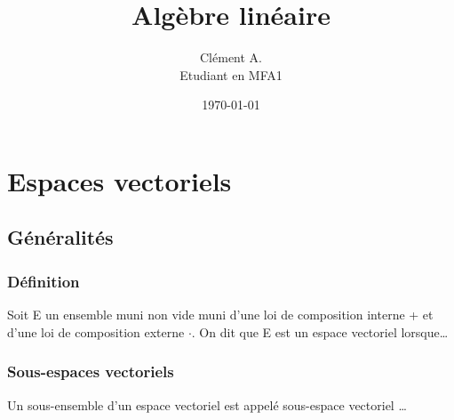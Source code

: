 \documentclass[a4paper,12pt]{report}
\title{Algèbre linéaire}%
\author{Clément A.\\ Etudiant en MFA1}%
\date{\today}%
\begin{document}
\maketitle%

\chapter{Espaces vectoriels}
\section{Généralités}

\subsection{Définition}

Soit E un ensemble muni non vide muni d'une loi de composition interne +
et d'une loi de composition externe $\cdot$. On dit que E est un espace
vectoriel lorsque\dots

\subsection{Sous-espaces vectoriels}
Un sous-ensemble d'un espace vectoriel est appelé sous-espace vectoriel \dots
\end{document}
